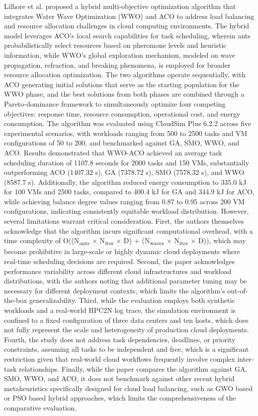 \documentclass[pdflatex,sn-mathphys-num]{sn-jnl}%
\theoremstyle{thmstyleone}%
\theoremstyle{thmstyletwo}%
\theoremstyle{thmstylethree}%
\begin{document}
Lilhore et al. \cite{lilhore2025} proposed a hybrid multi-objective optimization algorithm that integrates Water Wave Optimization (WWO) and ACO to address load balancing and resource allocation challenges in cloud computing environments. The hybrid model leverages ACO's local search capabilities for task scheduling, wherein ants probabilistically select resources based on pheromone levels and heuristic information, while WWO's global exploration mechanism, modeled on wave propagation, refraction, and breaking phenomena, is employed for broader resource allocation optimization. The two algorithms operate sequentially, with ACO generating initial solutions that serve as the starting population for the WWO phase, and the best solutions from both phases are combined through a Pareto-dominance framework to simultaneously optimize four competing objectives: response time, resource consumption, operational cost, and energy consumption. The algorithm was evaluated using CloudSim Plus 6.2.2 across five experimental scenarios, with workloads ranging from 500 to 2500 tasks and VM configurations of 50 to 200, and benchmarked against GA, SMO, WWO, and ACO. Results demonstrated that WWO-ACO achieved an average task scheduling duration of 1107.8 seconds for 2000 tasks and 150 VMs, substantially outperforming ACO (1407.32 s), GA (7378.72 s), SMO (7578.32 s), and WWO (8587.7 s). Additionally, the algorithm reduced energy consumption to 335.0 kJ for 100 VMs and 2500 tasks, compared to 400.4 kJ for GA and 344.9 kJ for ACO, while achieving balance degree values ranging from 0.87 to 0.95 across 200 VM configurations, indicating consistently equitable workload distribution.
However, several limitations warrant critical consideration. First, the authors themselves acknowledge that the algorithm incurs significant computational overhead, with a time complexity of O((N\textsubscript{ants} × N\textsubscript{iter} × D) + (N\textsubscript{waves} × N\textsubscript{iter} × D)), which may become prohibitive in large-scale or highly dynamic cloud deployments where real-time scheduling decisions are required. Second, the paper acknowledges performance variability across different cloud infrastructures and workload distributions, with the authors noting that additional parameter tuning may be necessary for different deployment contexts, which limits the algorithm's out-of-the-box generalizability. Third, while the evaluation employs both synthetic workloads and a real-world HPC2N log trace, the simulation environment is confined to a fixed configuration of three data centers and ten hosts, which does not fully represent the scale and heterogeneity of production cloud deployments. Fourth, the study does not address task dependencies, deadlines, or priority constraints, assuming all tasks to be independent and free, which is a significant restriction given that real-world cloud workflows frequently involve complex inter-task relationships. Finally, while the paper compares the algorithm against GA, SMO, WWO, and ACO, it does not benchmark against other recent hybrid metaheuristics specifically designed for cloud load balancing, such as GWO based or PSO based hybrid approaches, which limits the comprehensiveness of the comparative evaluation.
\end{document}
